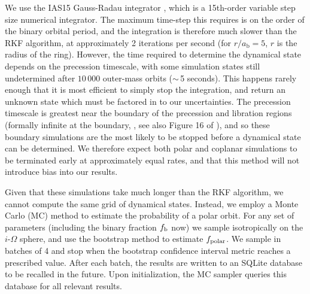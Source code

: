\documentclass[twocolumn,linenumbers]{aastex631}
\begin{document}
We use the IAS15 Gauss-Radau integrator \citep{reboundias15}, which is a 15th-order variable step size numerical integrator. The maximum time-step this requires is on the order of the binary orbital period, and the integration is therefore much slower than the RKF algorithm, at approximately 2 iterations per second (for $r/a_\text{b}=5$, $r$ is the radius of the ring). However, the time required to determine the dynamical state depends on the precession timescale, with some simulation states still undetermined after $10\,000$ outer-mass orbits ($\sim \,$5 seconds). This happens rarely enough that it is most efficient to simply stop the integration, and return an unknown state which must be factored in to our uncertainties. The precession timescale is greatest near the boundary of the precession and libration regions (formally infinite at the boundary, \citealt{farago2010}, see also Figure 16 of \citealt{rabago2024}), and so these boundary simulations are the most likely to be stopped before a dynamical state can be determined. We therefore expect both polar and coplanar simulations to be terminated early at approximately equal rates, and that this method will not introduce bias into our results.

Given that these simulations take much longer than the RKF algorithm, we cannot compute the same grid of dynamical states. Instead, we employ a Monte Carlo (MC) method to estimate the probability of a polar orbit. For any set of parameters (including the binary fraction $f_{\rm b}$ now) we sample isotropically on the $i$-$\Omega$ sphere, and use the bootstrap method to estimate $f_{\rm polar}$. We sample in batches of 4 and stop when the bootstrap confidence interval metric reaches a prescribed value. After each batch, the results are written to an SQLite database to be recalled in the future. Upon initialization, the MC sampler queries this database for all relevant results.
\end{document}

